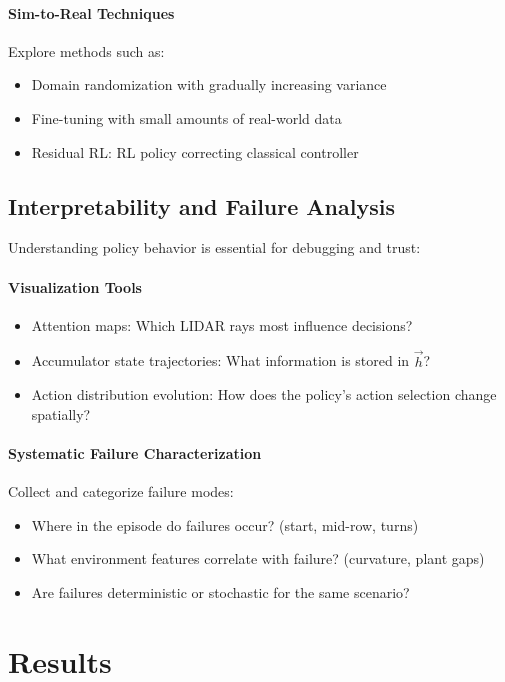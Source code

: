 \documentclass[11pt,a4paper,twocolumn]{article}
\begin{document}
\paragraph{Sim-to-Real Techniques}
Explore methods such as:
\begin{itemize}
    \item Domain randomization with gradually increasing variance
    \item Fine-tuning with small amounts of real-world data
    \item Residual RL: RL policy correcting classical controller
\end{itemize}

\subsection{Interpretability and Failure Analysis}

Understanding policy behavior is essential for debugging and trust:

\paragraph{Visualization Tools}
\begin{itemize}
    \item Attention maps: Which LIDAR rays most influence decisions?
    \item Accumulator state trajectories: What information is stored in $\vec{h}$?
    \item Action distribution evolution: How does the policy's action selection change spatially?
\end{itemize}

\paragraph{Systematic Failure Characterization}
Collect and categorize failure modes:
\begin{itemize}
    \item Where in the episode do failures occur? (start, mid-row, turns)
    \item What environment features correlate with failure? (curvature, plant gaps)
    \item Are failures deterministic or stochastic for the same scenario?
\end{itemize}


\section{Results}
\end{document}
